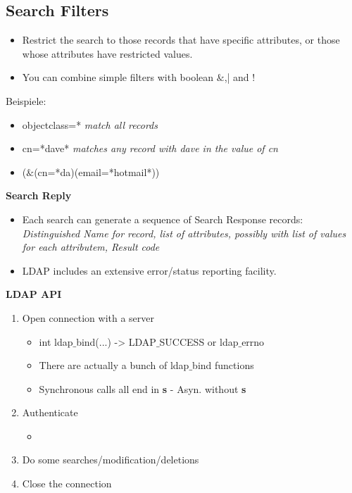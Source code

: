 \documentclass{article} %
\begin{document}
\subsection{Search Filters}
	\begin{itemize}
	\item Restrict the search to those records that have specific attributes, or those whose attributes have restricted values. 
	\item You can combine simple filters with boolean $\&$,| and !
	\end{itemize}
Beispiele:
	\begin{itemize}
	\item objectclass=* \textit{ match all records }
	\item cn=*dave* \textit{ matches any record with dave in the value of cn }
	\item ($\&$(cn=*da)(email=*hotmail*)) 
	\end{itemize}
\noindent\textbf{Search Reply}
	\begin{itemize}
	\item Each search can generate a sequence of Search Response records: \\
	\textit{Distinguished Name for record, list of attributes, possibly with list of values for each attributem, Result code }
	\item LDAP includes an extensive error/status reporting facility.
	\end{itemize}
\noindent\textbf{LDAP API }
	\begin{enumerate}
	\item Open connection with a server
		\begin{itemize}
		\item int ldap$\_$bind(...) ->  LDAP$\_$SUCCESS  or ldap$\_$errno
		\item There are actually a bunch of  ldap$\_$bind functions
		\item Synchronous calls all end in \textbf{s} - Asyn. without \textbf{s}
		\end{itemize}
	\item Authenticate
			\begin{itemize}
			\item 
			\end{itemize}
	\item Do some searches/modification/deletions
	\item Close the connection
	\end{enumerate}
	
\end{document}
